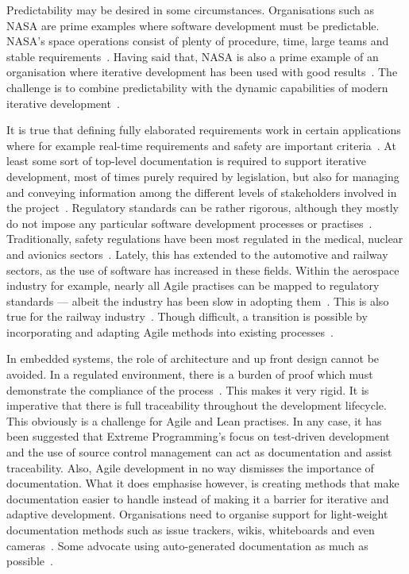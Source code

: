 \documentclass[english]{tktltiki2}
\begin{document}
Predictability may be desired in some circumstances. Organisations such as NASA are prime examples where software development must be predictable. NASA’s space operations consist of plenty of procedure, time, large teams and stable requirements~\cite{Fow05}. Having said that, NASA is also a prime example of an organisation where iterative development has been used with good results~\cite{LB03}. The challenge is to combine predictability with the dynamic capabilities of modern iterative development~\cite{EHS14}.

It is true that defining fully elaborated requirements work in certain applications where for example real-time requirements and safety are important criteria~\cite{Boe88, KRM13}. At least some sort of top-level documentation is required to support iterative development, most of times purely required by legislation, but also for managing and conveying information among the different levels of stakeholders involved in the project~\cite{KRM13, EHS14}. Regulatory standards can be rather rigorous, although they mostly do not impose any particular software development processes or practises~\cite{CWR10}. Traditionally, safety regulations have been most regulated in the medical, nuclear and avionics sectors~\cite{JLP12}. Lately, this has extended to the automotive and railway sectors, as the use of software has increased in these fields. Within the aerospace industry for example, nearly all Agile practises can be mapped to regulatory standards — albeit the industry has been slow in adopting them~\cite{VB09, CWR10}. This is also true for the railway industry~\cite{JLP12}. Though difficult, a transition is possible by incorporating and adapting Agile methods into existing processes~\cite{VB09}.

In embedded systems, the role of architecture and up front design cannot be avoided. In a regulated environment, there is a burden of proof which must demonstrate the compliance of the process~\cite{CWR10}. This makes it very rigid. It is imperative that there is full traceability throughout the development lifecycle. This obviously is a challenge for Agile and Lean practises. In any case, it has been suggested that Extreme Programming’s focus on test-driven development and the use of source control management can act as documentation and assist traceability. Also, Agile development in no way dismisses the importance of documentation. What it does emphasise however, is creating methods that make documentation easier to handle instead of making it a barrier for iterative and adaptive development. Organisations need to organise support for light-weight documentation methods such as issue trackers, wikis, whiteboards and even cameras~\cite{HMP12}. Some advocate using auto-generated documentation as much as possible~\cite{VB09, JLP12}.
\end{document}
